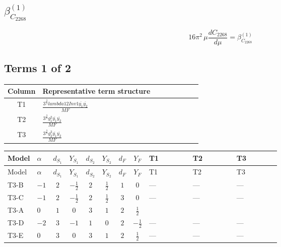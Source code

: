 \documentclass[8pt]{article}
\begin{document}
\begin{landscape}
\section*{$\beta_{C_{2268}}^{(1)}$}
\[16\pi^2\,\mu\frac{d C_{2268}}{d\mu}=\beta_{C_{2268}}^{(1)}\]
\subsection*{Terms 1 of 2}
\begin{center}
\begin{tabular}{@{}c >{\raggedright\arraybackslash}p{0.82\linewidth}@{}}
\toprule
Column & Representative term structure \\
\midrule
T1 & \(\displaystyle \frac{3^{\frac{3}{4}} lambda12Inv1 \overline{y_{1}} \overline{y_{2}}}{MF}\) \\
\midrule
T2 & \(\displaystyle \frac{3^{\frac{3}{4}} g_{1}^{2} \overline{y_{1}} \overline{y_{2}}}{MF}\) \\
\midrule
T3 & \(\displaystyle \frac{3^{\frac{3}{4}} g_{2}^{2} \overline{y_{1}} \overline{y_{2}}}{MF}\) \\
\midrule
\bottomrule
\end{tabular}
\end{center}
\smallskip
\tiny
\begin{longtable}{@{}llcccccc >{\raggedright\arraybackslash}p{0.21\linewidth} >{\raggedright\arraybackslash}p{0.21\linewidth} >{\raggedright\arraybackslash}p{0.21\linewidth}@{}}
\toprule
Model & $\alpha$ & $d_{S_1}$ & $Y_{S_1}$ & $d_{S_2}$ & $Y_{S_2}$ & $d_F$ & $Y_F$ & T1 & T2 & T3 \\
\midrule
\endfirsthead
\toprule
Model & $\alpha$ & $d_{S_1}$ & $Y_{S_1}$ & $d_{S_2}$ & $Y_{S_2}$ & $d_F$ & $Y_F$ & T1 & T2 & T3 \\
\midrule
\endhead
T3-B & $-1$ & $2$ & $-\frac{1}{2}$ & $2$ & $\frac{1}{2}$ & $1$ & $0$ & --- & --- & --- \\
\midrule
T3-C & $-1$ & $2$ & $-\frac{1}{2}$ & $2$ & $\frac{1}{2}$ & $3$ & $0$ & --- & --- & --- \\
\midrule
T3-A & $0$ & $1$ & $0$ & $3$ & $1$ & $2$ & $\frac{1}{2}$ & \scriptsize\adjustbox{max width=\linewidth}{$\begin{gathered} \frac{3^{\frac{3}{4}} lambda12Inv1 \overline{y_{1}} \overline{y_{2}}}{6 MF}\end{gathered}$} & \scriptsize\adjustbox{max width=\linewidth}{$\begin{gathered} \frac{3^{\frac{3}{4}} g_{1}^{2} \overline{y_{1}} \overline{y_{2}}}{8 MF}\end{gathered}$} & \scriptsize\adjustbox{max width=\linewidth}{$\begin{gathered} \frac{17 \cdot 3^{\frac{3}{4}} g_{2}^{2} \overline{y_{1}} \overline{y_{2}}}{24 MF}\end{gathered}$} \\
\midrule
T3-D & $-2$ & $3$ & $-1$ & $1$ & $0$ & $2$ & $-\frac{1}{2}$ & --- & --- & --- \\
\midrule
T3-E & $0$ & $3$ & $0$ & $3$ & $1$ & $2$ & $\frac{1}{2}$ & --- & --- & --- \\
\midrule
\bottomrule
\end{longtable}
\clearpage

\end{landscape}
\end{document}

